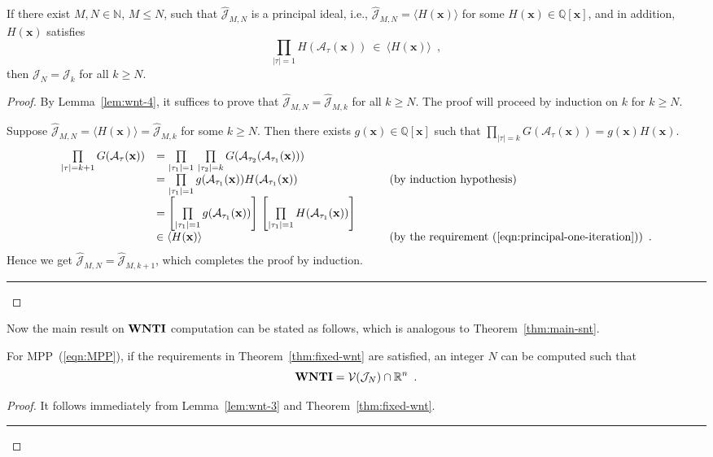 \documentclass{jssc}
\newcommand{\rulex}{\hfill\rule{1mm}{3mm}}
\newcommand{\A}{\mathcal{A}}
\newcommand{\J}{\mathcal{J}}
\newcommand{\V}{\mathcal{V}}
\newcommand{\xx}{\mathbf{x}}
\newcommand{\WNTI}{{\bf WNTI}}
\begin{document}
\begin{theorem}\label{thm:fixed-wnt}
If there exist $M,N \in \mathbb{N}$, $M\leq N$, such that $\hat{\J}_{M,N}$ is a principal ideal, i.e., $\hat{\J}_{M,N}=\langle H(\xx)\rangle$ for some $H(\xx) \in \mathbb{Q}[\xx]$, and in addition, $H(\xx)$ satisfies
\begin{equation}\label{eqn:principal-one-iteration}
\prod_{|\tau|=1} H(\A_{\tau}(\xx)) \ \in \ \langle H(\xx) \rangle \enspace ,
\end{equation}
then $\J_N=\J_k$ for all $k \geq N$.
\end{theorem}
\begin{proof}
By Lemma~\ref{lem:wnt-4}, it suffices to prove that $\hat{\J}_{M,N} = \hat{\J}_{M,k}$ for all $k \geq N$. The proof will proceed by induction on $k$ for $k \geq N$.

Suppose $\hat{\J}_{M,N}=\langle H(\xx) \rangle= \hat{\J}_{M,k}$ for some $k \geq N$. Then there exists $g(\xx) \in \mathbb{Q}[\xx]$ such that $\prod_{|\tau|=k} G(\A_{\tau}(\xx)) = g(\xx)H(\xx)$.
\[
\begin{array}{lll}
\prod\limits_{|\tau|=k+1} G(\A_{\tau}(\xx)) & = \prod\limits_{|\tau_1|=1}\, \prod\limits_{|\tau_2|=k} G(\A_{\tau_2}(\A_{\tau_1}(\xx))) \\
& = \prod\limits_{|\tau_1|=1} g(\A_{\tau_1}(\xx)) H(\A_{\tau_1}(\xx)) & \qquad \mbox{(by induction hypothesis)} \\
& = \left[ \prod\limits_{|\tau_1|=1} g(\A_{\tau_1}(\xx)) \right] \, \left[ \prod\limits_{|\tau_1|=1} H(\A_{\tau_1}(\xx)) \right] \\
& \in \langle H(\xx) \rangle & \qquad \mbox{(by the requirement~(\ref{eqn:principal-one-iteration}))} \enspace .
\end{array}
\]
Hence we get $\hat{\J}_{M,N}= \hat{\J}_{M,k+1}$, which completes the proof by induction. \rulex
\end{proof}

Now the main result on $\WNTI$ computation can be stated as follows, which is analogous to Theorem~\ref{thm:main-snt}.

\begin{theorem}\label{thm:main-wnt}
For MPP~(\ref{eqn:MPP}), if the requirements in Theorem~\ref{thm:fixed-wnt}  are satisfied, an integer $N$ can be computed such that
\[
\WNTI=\V(\J_N) \cap \mathbb{R}^n \enspace .
\]
\end{theorem}
\begin{proof}
It follows immediately from Lemma~\ref{lem:wnt-3} and Theorem~\ref{thm:fixed-wnt}. \rulex
\end{proof}
\end{document}
